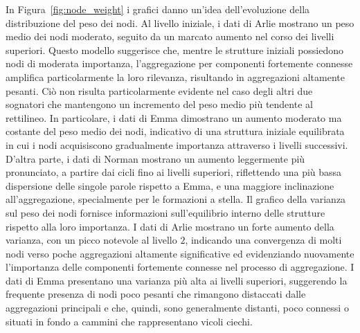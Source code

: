 In Figura~\ref{fig:node_weight} i grafici danno un'idea dell'evoluzione della distribuzione del peso dei nodi.
Al livello iniziale, i dati di Arlie mostrano un peso medio dei nodi moderato, seguito da un marcato aumento nel
corso dei livelli superiori.
Questo modello suggerisce che, mentre le strutture iniziali possiedono nodi di moderata importanza,
l'aggregazione per componenti fortemente connesse amplifica particolarmente la loro rilevanza, risultando in
aggregazioni altamente pesanti.
Ciò non risulta particolarmente evidente nel caso degli altri due sognatori che mantengono un incremento del peso
medio più tendente al rettilineo.
In particolare, i dati di Emma dimostrano un aumento moderato ma costante del peso medio dei nodi, indicativo di
una struttura iniziale equilibrata in cui i nodi acquisiscono gradualmente importanza attraverso i livelli successivi.
D'altra parte, i dati di Norman mostrano un aumento leggermente più pronunciato, a partire dai cicli fino ai
livelli superiori, riflettendo una più bassa dispersione delle singole parole rispetto a Emma, e una maggiore
inclinazione all'aggregazione, specialmente per le formazioni a stella.
Il grafico della varianza sul peso dei nodi fornisce informazioni sull'equilibrio interno delle strutture rispetto
alla loro importanza.
I dati di Arlie mostrano un forte aumento della varianza, con un picco notevole al livello $2$, indicando una convergenza
di molti nodi verso poche aggregazioni altamente significative ed evidenziando nuovamente l'importanza delle componenti
fortemente connesse nel processo di aggregazione.
I dati di Emma presentano una varianza più alta ai livelli superiori, suggerendo la frequente presenza di nodi
poco pesanti che rimangono distaccati dalle aggregazioni principali e che, quindi, sono generalmente distanti, poco
connessi o situati in fondo a cammini che rappresentano vicoli ciechi.

\newpage

